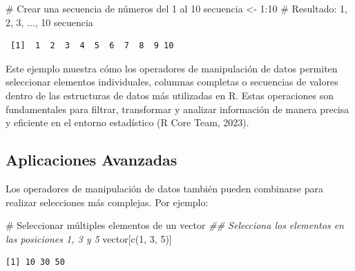 \documentclass[
  spanish,
  a4paper,
  DIV=11,
  numbers=noendperiod,
  onepage,
  openany]{scrreprt}
\newenvironment{Shaded}{\begin{snugshade}}{\end{snugshade}}
\newcommand{\CommentTok}[1]{\textcolor[rgb]{0.37,0.37,0.37}{#1}}
\newcommand{\DecValTok}[1]{\textcolor[rgb]{0.68,0.00,0.00}{#1}}
\newcommand{\DocumentationTok}[1]{\textcolor[rgb]{0.37,0.37,0.37}{\textit{#1}}}
\newcommand{\FunctionTok}[1]{\textcolor[rgb]{0.28,0.35,0.67}{#1}}
\newcommand{\NormalTok}[1]{\textcolor[rgb]{0.00,0.23,0.31}{#1}}
\newcommand{\OtherTok}[1]{\textcolor[rgb]{0.00,0.23,0.31}{#1}}
\newcommand{\SpecialCharTok}[1]{\textcolor[rgb]{0.37,0.37,0.37}{#1}}
\newcommand{\StringTok}[1]{\textcolor[rgb]{0.13,0.47,0.30}{#1}}
\begin{document}
\begin{Shaded}
\begin{Highlighting}[]
\CommentTok{\# Crear una secuencia de números del 1 al 10}
\NormalTok{secuencia }\OtherTok{\textless{}{-}} \DecValTok{1}\SpecialCharTok{:}\DecValTok{10}   \CommentTok{\# Resultado: 1, 2, 3, ..., 10               }
\NormalTok{secuencia}
\end{Highlighting}
\end{Shaded}

\begin{verbatim}
 [1]  1  2  3  4  5  6  7  8  9 10
\end{verbatim}

Este ejemplo muestra cómo los operadores de manipulación de datos
permiten seleccionar elementos individuales, columnas completas o
secuencias de valores dentro de las estructuras de datos más utilizadas
en R. Estas operaciones son fundamentales para filtrar, transformar y
analizar información de manera precisa y eficiente en el entorno
estadístico (R Core Team, 2023).

\subsection{Aplicaciones Avanzadas}\label{aplicaciones-avanzadas}

Los operadores de manipulación de datos también pueden combinarse para
realizar selecciones más complejas. Por ejemplo:

\begin{Shaded}
\begin{Highlighting}[]
\CommentTok{\# Seleccionar múltiples elementos de un vector}
\DocumentationTok{\#\# Selecciona los elementos en las posiciones 1, 3 y 5}
\NormalTok{vector[}\FunctionTok{c}\NormalTok{(}\DecValTok{1}\NormalTok{, }\DecValTok{3}\NormalTok{, }\DecValTok{5}\NormalTok{)]   }
\end{Highlighting}
\end{Shaded}

\begin{verbatim}
[1] 10 30 50
\end{verbatim}

\begin{Shaded}
\end{Shaded}
\end{document}
